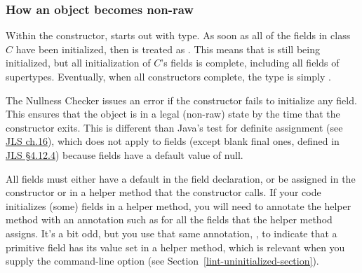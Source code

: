

\subsubsection{How an object becomes non-raw\label{becoming-non-raw}}

Within the constructor,
 starts out with  type.
As soon as all of the  fields
in class $C$ have been initialized, then  is treated as
.
This means that  is still being initialized, but all
initialization of $C$'s fields is complete, including all fields of supertypes.
Eventually, when all constructors complete, the type is simply
.

The Nullness Checker issues an error if the constructor fails to initialize
any  field.  This ensures that the object is in a legal (non-raw)
state by the time that the constructor exits.
This is different than Java's test for definite assignment (see
\href{https://docs.oracle.com/javase/specs/jls/se8/html/jls-16.html}{JLS ch.16}),
which does not apply to fields (except blank final ones, defined in
\href{https://docs.oracle.com/javase/specs/jls/se8/html/jls-4.html#jls-4.12.4}{JLS \S 4.12.4}) because fields
have a default value of null.



All  fields must either have a
default in the field declaration, or be assigned in the constructor or in a
helper method that the constructor calls.  If
your code initializes (some) fields in a helper method, you will need to
annotate the helper method with an annotation such as
for all the fields that the helper method assigns.
It's a bit odd, but you use that same annotation, ,
to indicate that a primitive field has its value set in a helper method,
which is relevant when you supply the 
command-line option (see Section~\ref{lint-uninitialized-section}).

